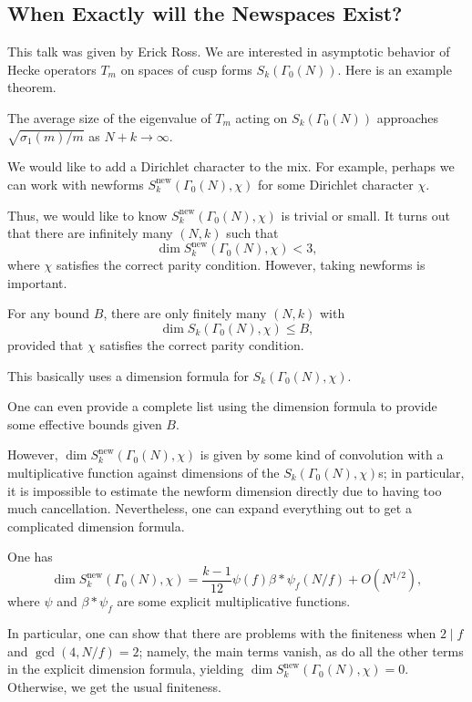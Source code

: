 \documentclass{article}
\begin{document}
\subsection{When Exactly will the Newspaces Exist?}
This talk was given by Erick Ross. We are interested in asymptotic behavior of Hecke operators $T_m$ on spaces of cusp forms $S_k(\Gamma_0(N))$. Here is an example theorem.
\begin{theorem}
	The average size of the eigenvalue of $T_m$ acting on $S_k(\Gamma_0(N))$ approaches $\sqrt{\sigma_1(m)/m}$ as $N+k\to\infty$.
\end{theorem}
We would like to add a Dirichlet character to the mix. For example, perhaps we can work with newforms $S_k^{\mathrm{new}}(\Gamma_0(N),\chi)$ for some Dirichlet character $\chi$.

Thus, we would like to know $S_k^{\mathrm{new}}(\Gamma_0(N),\chi)$ is trivial or small. It turns out that there are infinitely many $(N,k)$ such that
\[\dim S_k^{\mathrm{new}}(\Gamma_0(N),\chi)<3,\]
where $\chi$ satisfies the correct parity condition. However, taking newforms is important.
\begin{theorem}
	For any bound $B$, there are only finitely many $(N,k)$ with
	\[\dim S_k(\Gamma_0(N),\chi)\le B,\]
	provided that $\chi$ satisfies the correct parity condition.
\end{theorem}
This basically uses a dimension formula for $S_k(\Gamma_0(N),\chi)$.
\begin{remark}
	One can even provide a complete list using the dimension formula to provide some effective bounds given $B$.
\end{remark}
However, $\dim S_k^{\mathrm{new}}(\Gamma_0(N),\chi)$ is given by some kind of convolution with a multiplicative function against dimensions of the $S_k(\Gamma_0(N),\chi)$s; in particular, it is impossible to estimate the newform dimension directly due to having too much cancellation. Nevertheless, one can expand everything out to get a complicated dimension formula.
\begin{proposition}
	One has
	\[\dim S_k^{\mathrm{new}}(\Gamma_0(N),\chi)=\frac{k-1}{12}\psi(f)\beta*\psi_f(N/f)+O\left(N^{1/2}\right),\]
	where $\psi$ and $\beta*\psi_f$ are some explicit multiplicative functions.
\end{proposition}
In particular, one can show that there are problems with the finiteness when $2\mid f$ and $\gcd(4,N/f)=2$; namely, the main terms vanish, as do all the other terms in the explicit dimension formula, yielding $\dim S_k^{\mathrm{new}}(\Gamma_0(N),\chi)=0$. Otherwise, we get the usual finiteness.
\end{document}
